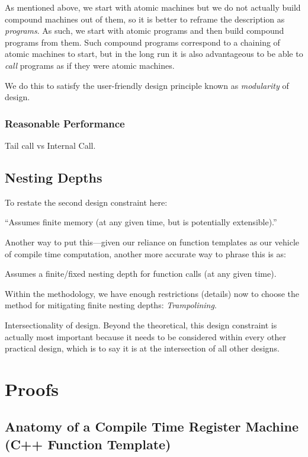 \documentclass[twoside]{article}
\begin{document}
As mentioned above, we start with atomic machines but we do not actually build compound machines out of them,
so it is better to reframe the description as \emph{programs}. As such, we start with atomic programs and then
build compound programs from them. Such compound programs correspond to a chaining of atomic machines to start,
but in the long run it is also advantageous to be able to \emph{call} programs as if they were atomic machines.

We do this to satisfy the user-friendly design principle known as \emph{modularity} of design.

\subsubsection*{Reasonable Performance}

Tail call vs Internal Call.

\subsection*{Nesting Depths}

To restate the second design constraint here:

\begin{center}
``Assumes finite memory (at any given time, but is potentially extensible).''
\end{center}

Another way to put this---given our reliance on function templates as our vehicle of compile time computation,
another more accurate way to phrase this is as:

\begin{center}
Assumes a finite/fixed nesting depth for function calls (at any given time).
\end{center}

Within the methodology, we have enough restrictions (details) now to choose the method for mitigating finite
nesting depths: \emph{Trampolining}.

Intersectionality of design. Beyond the theoretical, this design constraint is actually most important because
it needs to be considered within every other practical design, which is to say it is at the intersection of all
other designs.

\section*{Proofs}

\subsection*{Anatomy of a Compile Time Register Machine (C++ Function Template)}
\end{document}
